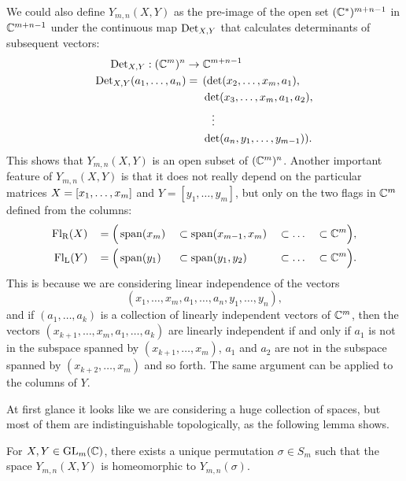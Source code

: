 We could also define $Y_{m,n}(X,Y)$ as the
pre-image of the open set $(\mathbb{C}^*)^{m+n-1}$ in $\mathbb{C}^{m+n-1}$ under the
continuous map $\operatorname{Det}_{X,Y}$ that calculates determinants of subsequent
vectors:
\begin{align*}
  \operatorname{Det}_{X,Y} : (\mathbb{C}^m)^n \to &\;\mathbb{C}^{m+n-1} \\
  \operatorname{Det}_{X,Y}(a_1,\dots,a_n) = \,&\; (\det(x_2,\dots,x_m,a_1),\\
  &\; \det(x_3,\dots,x_m,a_1,a_2), \\
  &\;\;\;\; \vdots\\
  &\; \det(a_n,y_1,\dots,y_{m-1})).
\end{align*}
This shows that $Y_{m,n}(X,Y)$ is an open subset of
$(\mathbb{C}^m)^n$. Another important
feature of $Y_{m,n}(X,Y)$ is that it does not really depend on the
particular matrices
$X =\nobreak [x_1,\dots,x_m]$ and $Y = [y_1,\dots,y_m]$,
but only on the two flags in $\mathbb{C}^{m}$ defined from the columns:
\begin{alignat*}{5}
  \mathrm{Fl_R}(X)\, &&= \Big(&\operatorname{span}(x_m) &&\subset \operatorname{span}(x_{m-1},x_m)
  &&\subset \dots &&\subset \mathbb{C}^m\Big), \\
  \mathrm{Fl_L}(Y)\, &&= \Big(&\operatorname{span}(y_1) &&\subset \operatorname{span}(y_1,y_2)
  &&\subset \dots &&\subset \mathbb{C}^m\Big).
\end{alignat*}
This is because we are considering linear independence of the vectors
\[ (x_1,\dots,x_m,a_1,\dots,a_n,y_1,\dots,y_n), \]
and if $(a_1,\dots,a_{k})$ is a collection of linearly independent
vectors of $\mathbb{C}^m$, then the vectors
$(x_{k+1},\dots,x_m,a_1,\dots,a_{k})$ are
linearly independent if and only if $a_1$ is not in the subspace
spanned by $(x_{k+1},\dots,x_m)$, $a_1$ and $a_2$ are not in the
subspace spanned by $(x_{k+2},\dots,x_m)$ and so forth. The same
argument can be applied to the columns of $Y$.

At first glance it looks like we are considering a huge collection of
spaces, but most of them are indistinguishable topologically, as the
following lemma shows.

\begin{lemma} \label{lem:rum-perm}
  For $X,Y\in \operatorname{GL}_m(\mathbb{C})$, there exists a unique permutation $\sigma
  \in S_m$ such that the space
  $Y_{m,n}(X,Y)$ is homeomorphic to $Y_{m,n}(\sigma)$.
\end{lemma}


